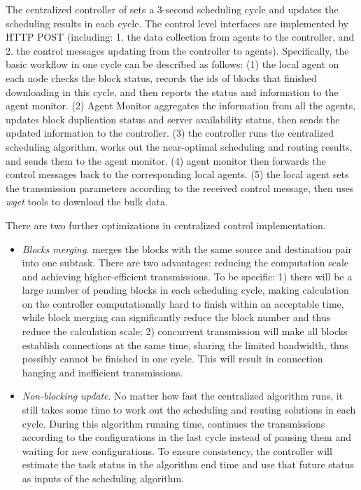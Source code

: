 The centralized controller of \name sets a 3-second scheduling cycle and updates the scheduling results in each cycle. The control level interfaces are implemented by HTTP POST (including: 1. the data collection from agents to the controller, and 2. the control messages updating from the controller to agents). Specifically, the basic workflow in one cycle can be described as follows: (1) the local agent on each node checks the block status, records the ids of blocks that finished downloading in this cycle, and then reports the status and information to the agent monitor. (2) Agent Monitor aggregates the information from all the agents, updates block duplication status and server availability status, then sends the updated information to the controller. (3) the controller runs the centralized scheduling algorithm, works out the near-optimal scheduling and routing results, and sends them to the agent monitor. (4) agent monitor then forwards the control messages back to the corresponding local agents. (5) the local agent sets the transmission parameters according to the received control message, then uses \emph{wget} tools to download the bulk data.

There are two further optimizations in centralized control implementation.
\begin{itemize}
\item \emph{Blocks merging}. \name merges the blocks with the same source and destination pair into one subtask. There are two advantages: reducing the computation scale and achieving higher-efficient transmissions. To be specific: 1) there will be a large number of pending blocks in each scheduling cycle, making calculation on the controller computationally hard to finish within an acceptable time, while block merging can significantly reduce the block number and thus reduce the calculation scale; 2) concurrent transmission will make all blocks establish connections at the same time, sharing the limited bandwidth, thus possibly cannot be finished in one cycle. This will result in connection hanging and inefficient transmissions.
\item \emph{Non-blocking update}. No matter how fast the centralized algorithm runs, it still takes some time to work out the scheduling and routing solutions in each cycle. During this algorithm running time, \name continues the transmissions according to the configurations in the last cycle instead of pausing them and waiting for new configurations. To ensure consistency, the controller will estimate the task status in the algorithm end time and use that future status as inputs of the scheduling algorithm.
\end{itemize}

